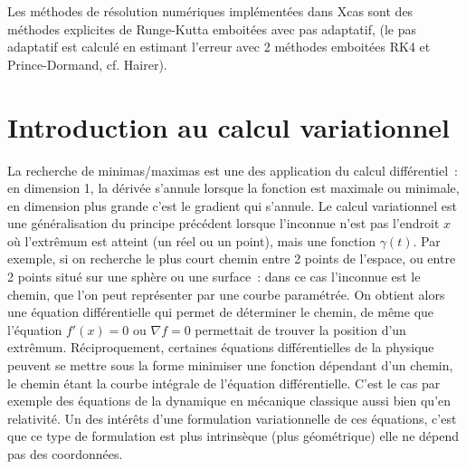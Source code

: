 \documentclass[a4paper,11pt]{book}
\begin{document}
\begin{giacjshere}
Les méthodes de résolution numériques implémentées dans Xcas sont
des méthodes explicites de Runge-Kutta emboitées avec pas adaptatif, 
(le pas adaptatif est calcul\'e en estimant l'erreur 
avec 2 méthodes emboitées RK4 et
Prince-Dormand, cf. Hairer).


\chapter{Introduction au calcul variationnel} \label{sec:lagrangien}
La recherche de minimas/maximas est une des application 
du calcul diff\'erentiel~: en dimension 1, la d\'eriv\'ee s'annule
lorsque la fonction est maximale ou minimale, en dimension plus
grande c'est le gradient qui s'annule. Le calcul variationnel
est une g\'en\'eralisation du principe pr\'ec\'edent lorsque
l'inconnue n'est pas l'endroit $x$ o\`u l'extr\^emum est atteint
(un r\'eel ou un point), mais une fonction $\gamma(t)$. 
Par exemple, si on recherche
le plus court chemin entre 2 points de l'espace, ou entre 2 points
situ\'e sur une sph\`ere ou une surface~: dans ce cas l'inconnue
est le chemin, que l'on peut repr\'esenter par une courbe 
param\'etr\'ee. On obtient alors une \'equation diff\'erentielle
qui permet de d\'eterminer le chemin, de m\^eme que l'\'equation
$f'(x)=0$ ou $\nabla f=0$ permettait de trouver la position
d'un extr\^emum. R\'eciproquement, certaines \'equations
diff\'erentielles de la physique peuvent se mettre sous la forme minimiser une
fonction d\'ependant d'un chemin, le chemin \'etant la courbe
int\'egrale de l'\'equation diff\'erentielle. C'est le cas par
exemple des \'equations de la dynamique en m\'ecanique
classique aussi bien qu'en relativit\'e. Un des int\'er\^ets d'une
formulation variationnelle de ces \'equations, c'est que ce type
de formulation est plus intrins\`eque (plus g\'eom\'etrique) 
elle ne d\'epend pas des coordonn\'ees.


\end{giacjshere}
\end{document}
